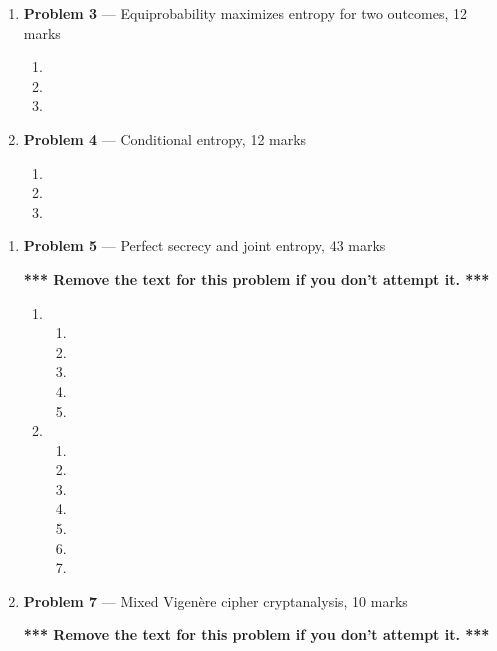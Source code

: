 \documentclass[11pt]{article}
\theoremstyle{definition}
\begin{document}
\begin{enumerate}
\item[] \textbf{Problem 3} --- Equiprobability maximizes entropy for two outcomes, 12 marks


\begin{enumerate}
\item
\item

\item

\end{enumerate}

\item[] \textbf{Problem 4} --- Conditional entropy, 12 marks

\begin{enumerate}
\item

\item
\item
\end{enumerate}
\end{enumerate}


\begin{enumerate}
\item[] \textbf{Problem 5} --- Perfect secrecy and joint entropy, 43 marks

\textbf{*** Remove the text for this problem if you don't attempt it. ***}

\begin{enumerate}

\item
\begin{enumerate}

\item

\item

\item

\item

\item
\end{enumerate}

\item
\begin{enumerate}
\item

\item

\item

\item

\item

\item

\item
\end{enumerate}
\end{enumerate}

\item[] \textbf{Problem 7} --- Mixed Vigen\`ere cipher cryptanalysis, 10 marks

\textbf{*** Remove the text for this problem if you don't attempt it. ***}


\end{enumerate}
\end{document}
